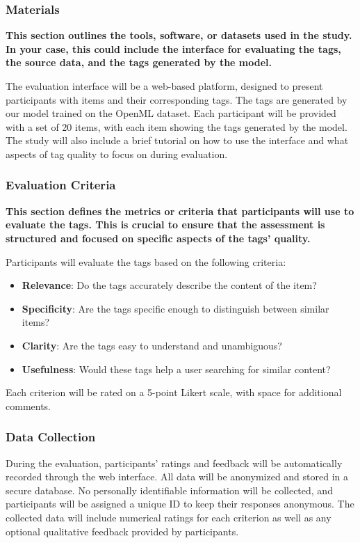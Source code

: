 \subsubsection{Materials}
\textbf{This section outlines the tools, software, or datasets used in the study. In your case, this could include the interface for evaluating the tags, the source data, and the tags generated by the model.}

The evaluation interface will be a web-based platform, designed to present participants with items and their corresponding tags. The tags are generated by our model trained on the OpenML dataset. Each participant will be provided with a set of 20 items, with each item showing the tags generated by the model. The study will also include a brief tutorial on how to use the interface and what aspects of tag quality to focus on during evaluation.

\subsubsection{Evaluation Criteria}
\textbf{This section defines the metrics or criteria that participants will use to evaluate the tags. This is crucial to ensure that the assessment is structured and focused on specific aspects of the tags' quality.}

Participants will evaluate the tags based on the following criteria:
\begin{itemize}
    \item \textbf{Relevance}: Do the tags accurately describe the content of the item?
    \item \textbf{Specificity}: Are the tags specific enough to distinguish between similar items?
    \item \textbf{Clarity}: Are the tags easy to understand and unambiguous?
    \item \textbf{Usefulness}: Would these tags help a user searching for similar content?
\end{itemize}
Each criterion will be rated on a 5-point Likert scale, with space for additional comments.

\subsubsection{Data Collection}
During the evaluation, participants' ratings and feedback will be automatically recorded through the web interface. All data will be anonymized and stored in a secure database. No personally identifiable information will be collected, and participants will be assigned a unique ID to keep their responses anonymous. The collected data will include numerical ratings for each criterion as well as any optional qualitative feedback provided by participants.

